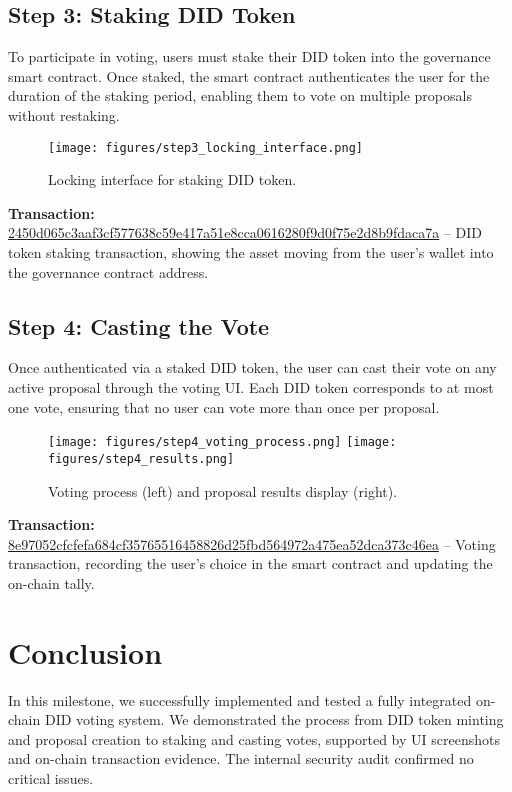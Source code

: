 \documentclass{article}
\begin{document}
\subsection{Step 3: Staking DID Token}
To participate in voting, users must stake their DID token into the governance smart contract.  
Once staked, the smart contract authenticates the user for the duration of the staking period, enabling them to vote on multiple proposals without restaking.

\begin{figure}[H]
    \centering
    \texttt{[image: figures/step3\_locking\_interface.png]}
    \caption{Locking interface for staking DID token.}
\end{figure}

\noindent
\textbf{Transaction:}  
\href{https://cexplorer.io/tx/2450d065c3aaf3cf577638c59e417a51e8cca0616280f9d0f75e2d8b9fdaca7a}{2450d065c3aaf3cf577638c59e417a51e8cca0616280f9d0f75e2d8b9fdaca7a} – DID token staking transaction, showing the asset moving from the user's wallet into the governance contract address.

\subsection{Step 4: Casting the Vote}
Once authenticated via a staked DID token, the user can cast their vote on any active proposal through the voting UI.  
Each DID token corresponds to at most one vote, ensuring that no user can vote more than once per proposal.

\begin{figure}[H]
    \centering
    \texttt{[image: figures/step4\_voting\_process.png]}
    \hfill
    \texttt{[image: figures/step4\_results.png]}
    \caption{Voting process (left) and proposal results display (right).}
\end{figure}

\noindent
\textbf{Transaction:}  
\href{https://cexplorer.io/tx/8e97052cfcfefa684cf35765516458826d25fbd564972a475ea52dca373c46ea}{8e97052cfcfefa684cf35765516458826d25fbd564972a475ea52dca373c46ea} – Voting transaction, recording the user's choice in the smart contract and updating the on-chain tally.


\section{Conclusion}

In this milestone, we successfully implemented and tested a fully integrated on-chain DID voting system.  
We demonstrated the process from DID token minting and proposal creation to staking and casting votes, supported by UI screenshots and on-chain transaction evidence.  
The internal security audit confirmed no critical issues.
\end{document}
